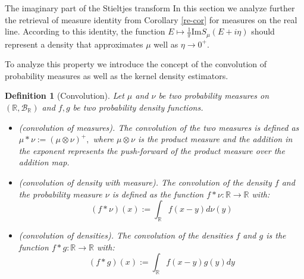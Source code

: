 \documentclass[11pt, a4paper, oneside]{book}
\numberwithin{equation}{chapter}
\newtheorem{definition}{Definition}[section]
\begin{document}
\begin{section}{The imaginary part of the Stieltjes transform} \label{s:ImS}
In this section we analyze further the retrieval of measure identity from Corollary \ref{re-cor} for measures on the real line. According to this identity, the function $E \mapsto \frac{1}{\pi} \mathrm{Im} S_\mu (E+i\eta)$ should represent a density that approximates $\mu$ well as $\eta \to 0^+.$

To analyze this property we introduce the concept of the convolution of probability measures as well as the kernel density estimators.

\begin{definition}[Convolution] Let $\mu$ and $\nu$ be two probability measures on $(\mathbb{R},\mathcal{B}_{\mathbb{R}})$ and $f,g$ be two probability density functions.
\begin{itemize}
    \item (convolution of measures). The convolution of the two measures is defined as $\mu \ast \nu := (\mu \otimes \nu)^+,$ where $\mu \otimes \nu$ is the product measure and the addition in the exponent represents the push-forward of the product measure over the addition map.
    
    \item (convolution of density with measure). The convolution of the density $f$ and the probability measure $\nu$ is defined as the function $f \ast \nu: \mathbb{R} \to \mathbb{R}$ with:
    \[
    (f \ast \nu)(x) := \int_{\mathbb{R}} f(x-y) d\nu(y)
    \]
    
    \item (convolution of densities). The convolution of the densities $f$ and $g$ is the function $f \ast g: \mathbb{R} \to \mathbb{R}$ with:
    \[
    (f \ast g)(x) := \int_{\mathbb{R}} f(x-y) g(y) dy
    \]
\end{itemize}
\end{definition}


\end{section}
\end{document}
